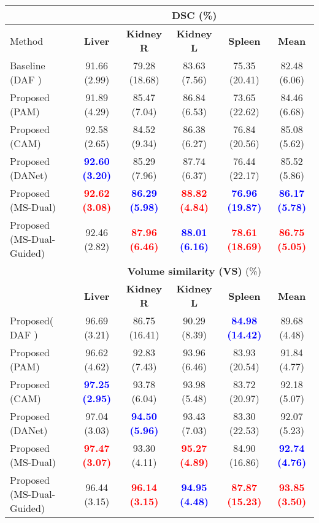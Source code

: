 \documentclass[journal]{IEEEtran}
\begin{document}
\begin{table*}[ht!]
\centering
\scriptsize
\begin{tabular}{lcccc|c}\\
\toprule
 & \multicolumn{5}{c}{\textbf{DSC} (\%)}\\
 \midrule
Method & \textbf{Liver} & \textbf{Kidney R} & \textbf{Kidney L} & \textbf{Spleen} & \textbf{Mean}  \\
\midrule
Baseline (DAF \cite{wang18d})  &  91.66 (2.99) & 79.28 (18.68)& 83.63 (7.56) &  75.35 (20.41)&  82.48 (6.06)   \\
Proposed (PAM)     &  91.89 (4.29)& 85.47 (7.04)& 86.84 (6.53)  & 73.65 (22.62)& 84.46 (6.68)   \\
Proposed (CAM)     &  92.58 (2.65) & 84.52 (9.34)& 86.38 (6.27)& 76.84 (20.56) & 85.08 (5.62)\\
Proposed (DANet) &  \textcolor{blue}{\textbf{92.60 (3.20)}} & 85.29 (7.96) & 87.74 (6.37)& 76.44 (22.17)&  85.52 (5.86)       \\
Proposed (MS-Dual)  & \textcolor{red}{\textbf{92.62 (3.08)}}  & \textcolor{blue}{\textbf{86.29 (5.98)}} & \textcolor{red}{\textbf{88.82 (4.84)}}  & \textcolor{blue}{\textbf{76.96 (19.87)}} &  \textcolor{blue}{\textbf{86.17 (5.78)}}\\
Proposed (MS-Dual-Guided)  & 92.46 (2.82)  & \textcolor{red}{\textbf{87.96 (6.46)}}& \textcolor{blue}{\textbf{88.01 (6.16)}}  & \textcolor{red}{\textbf{78.61 (18.69)}} &  \textcolor{red}{\textbf{86.75 (5.05)}}\\
\midrule
& \multicolumn{5}{c}{\textbf{Volume similarity (VS)} (\%)}\\
 \midrule
 & \textbf{Liver} & \textbf{Kidney R} & \textbf{Kidney L} & \textbf{Spleen} & \textbf{Mean}  \\

\midrule
Proposed( DAF \cite{wang18d})  &  96.69 (3.21) & 86.75 (16.41) & 90.29 (8.39) & \textcolor{blue}{\textbf{84.98 (14.42)}} &   89.68 (4.48)  \\
Proposed (PAM)     & 96.62 (4.62)& 92.83 (7.43)& 93.96 (6.46)& 83.93 (20.54)&  91.84 (4.77) \\
Proposed (CAM)     & \textcolor{blue}{\textbf{97.25 (2.95)}}  & 93.78 (6.04)& 93.98 (5.48)& 83.72 (20.97)& 92.18 (5.07)\\
Proposed (DANet) &  97.04 (3.03)& \textcolor{blue}{\textbf{94.50 (5.96)}} & 93.43 (7.03)& 83.30 (22.53)&  92.07 (5.23)     \\
Proposed (MS-Dual)  & \textcolor{red}{\textbf{97.47 (3.07)}}  & 93.30 (4.11)& \textcolor{red}{\textbf{95.27 (4.89)}}  & 84.90 (16.86) & \textcolor{blue}{\textbf{92.74 (4.76)}} \\
Proposed (MS-Dual-Guided)  &  96.44 (3.15)  & \textcolor{red}{\textbf{96.14 (3.15)}}& \textcolor{blue}{\textbf{94.95 (4.48)}}  & \textcolor{red}{\textbf{87.87 (15.23)}} & \textcolor{red}{\textbf{93.85 (3.50)}} \\


\end{tabular}
\end{table*}
\end{document}
